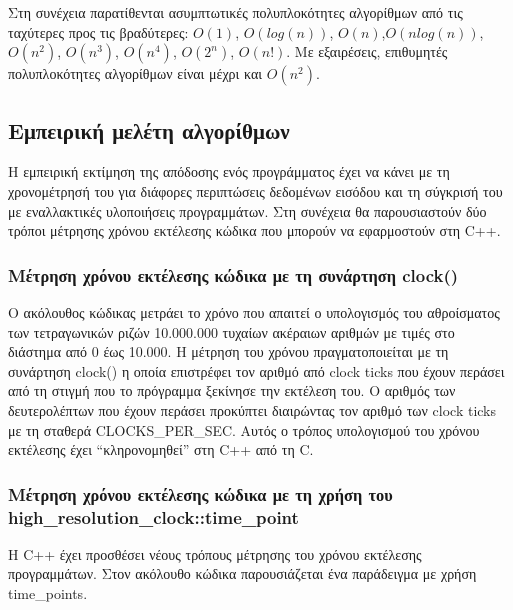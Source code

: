 Στη συνέχεια παρατίθενται ασυμπτωτικές πολυπλοκότητες αλγορίθμων από τις ταχύτερες προς τις βραδύτερες: $O(1)$, $O(log(n))$, $O(n)$,$O(nlog(n))$, $O(n^2)$, $O(n^3)$, $O(n^4)$, $O(2^n)$, $O(n!)$. Με εξαιρέσεις, επιθυμητές πολυπλοκότητες αλγορίθμων είναι μέχρι και $O(n^2)$.

\subsection{Εμπειρική μελέτη αλγορίθμων}
H εμπειρική εκτίμηση της απόδοσης ενός προγράμματος έχει να κάνει με τη χρονομέτρησή του για διάφορες περιπτώσεις δεδομένων εισόδου και τη σύγκρισή του με εναλλακτικές υλοποιήσεις προγραμμάτων. Στη συνέχεια θα παρουσιαστούν δύο τρόποι μέτρησης χρόνου εκτέλεσης κώδικα που μπορούν να εφαρμοστούν στη C++.

\subsubsection{Μέτρηση χρόνου εκτέλεσης κώδικα με τη συνάρτηση clock()}
Ο ακόλουθος κώδικας μετράει το χρόνο που απαιτεί ο υπολογισμός του αθροίσματος των τετραγωνικών ριζών 10.000.000 τυχαίων ακέραιων αριθμών με τιμές στο διάστημα από 0  έως 10.000. Η μέτρηση του χρόνου πραγματοποιείται με τη συνάρτηση clock() η οποία επιστρέφει τον αριθμό από clock ticks που έχουν περάσει από τη στιγμή που το πρόγραμμα ξεκίνησε την εκτέλεση του. Ο αριθμός των δευτερολέπτων που έχουν περάσει προκύπτει διαιρώντας τον αριθμό των clock ticks με τη σταθερά CLOCKS\_PER\_SEC. Αυτός ο τρόπος υπολογισμού του χρόνου εκτέλεσης έχει ``κληρονομηθεί'' στη C++ από τη C.





\subsubsection{Μέτρηση χρόνου εκτέλεσης κώδικα με τη χρήση του high\_resolution\_clock::time\_point}
Η C++ έχει προσθέσει νέους τρόπους μέτρησης του χρόνου εκτέλεσης προγραμμάτων. Στον ακόλουθο κώδικα παρουσιάζεται ένα παράδειγμα με χρήση time\_points.





